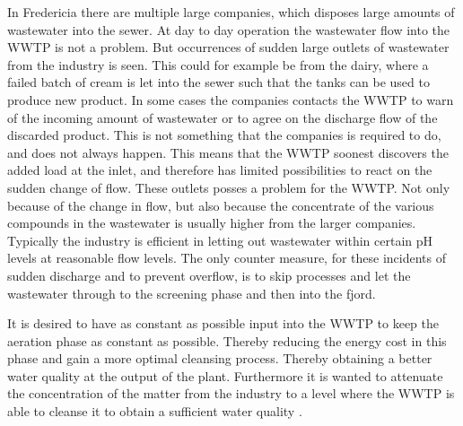In Fredericia there are multiple large companies, which disposes large amounts of wastewater into the sewer. At day to day operation the wastewater flow into the WWTP is not a problem. But occurrences of sudden large outlets of wastewater from the industry is seen. This could for example be from the dairy, where a failed batch of cream is let into the sewer such that the tanks can be used to produce new product. In some cases the companies contacts the WWTP to warn of the incoming amount of wastewater or to agree on the discharge flow of the discarded product. This is not something that the companies is required to do, and does not always happen. This means that the WWTP soonest discovers the added load at the inlet, and therefore has limited possibilities to react on the sudden change of flow.
These outlets posses a problem for the WWTP. Not only because of the change in flow, but also because the concentrate of the various compounds in the wastewater is usually higher from the larger companies. Typically the industry is efficient in letting out wastewater within certain pH levels at reasonable flow levels. The only counter measure, for these incidents of sudden discharge and to prevent overflow, is to skip processes and let the wastewater through to the screening phase  and then into the fjord.

It is desired to have as constant as possible input into the WWTP to keep the aeration phase as constant as possible. Thereby reducing the energy cost in this phase and gain a more optimal cleansing process. Thereby obtaining a better water quality at the output of the plant. Furthermore it is wanted to attenuate the concentration of the matter from the industry to a level where the WWTP is able to cleanse it to obtain a sufficient water quality \cite{fredericia_spildevand_mode}. 

